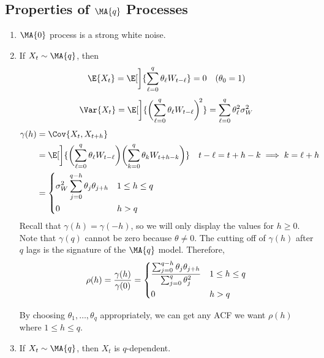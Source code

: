 \subsection*{Properties of $ \MA{q} $ Processes}
\begin{enumerate}[(1)]
    \item $ \MA{0} $ process is a strong white noise.
    \item If $ X_t\sim\MA{q} $, then
          \[ \E{X_t}=\E[\bigg]{\sum_{\ell=0}^{q} \theta_\ell W_{t-\ell}}=0\quad (\theta_0=1) \]
          \[ \Var{X_t}=\E[\bigg]{\biggl(\sum_{\ell=0}^{q} \theta_\ell W_{t-\ell}\biggr)^{\!2}}=
              \sum_{\ell=0}^{q} \theta_\ell^2\sigma_W^2 \]
          \begin{align*}
              \gamma(h)
                                                               & =\Cov{X_t,X_{t+h}}                                                                                \\
                                                               & =\E[\bigg]{\biggl(\sum_{\ell=0}^{q} \theta_\ell W_{t-\ell}\biggr)
              \biggl(\sum_{k=0}^{q} \theta_k W_{t+h-k}\biggr)} &                                                                   & t-\ell=t+h-k\implies k=\ell+h \\
                                                               & =\begin{dcases}
                  \sigma_W^2\sum_{j=0}^{q-h} \theta_j \theta_{j+h} & 1\le h\le q \\
                  0                                                & h>q
              \end{dcases}
          \end{align*}
          Recall that $ \gamma(h)=\gamma(-h) $, so we will only display the values
          for $ h\ge 0 $. Note that $ \gamma(q) $ cannot be zero
          because $ \theta\ne 0 $. The cutting off of $ \gamma(h) $
          after $ q $ lags is the signature of the $ \MA{q} $ model.
          Therefore,
          \[ \rho(h)=\frac{\gamma(h)}{\gamma(0)} =
              \begin{dcases}
                  \frac{\sum_{j=0}^{q-h} \theta_j \theta_{j+h}}{\sum_{j=0}^{q} \theta_j^2} & 1\le h\le q \\
                  0                                                                        & h>q
              \end{dcases} \]
          \begin{Remark}{}{}
              By choosing $ \theta_1,\ldots,\theta_q $ appropriately, we can
              get any ACF we want $ \rho(h) $ where $ 1\le h\le q $.
          \end{Remark}
    \item If $ X_t\sim\MA{q} $, then $ X_t $ is $ q $-dependent.
\end{enumerate}
